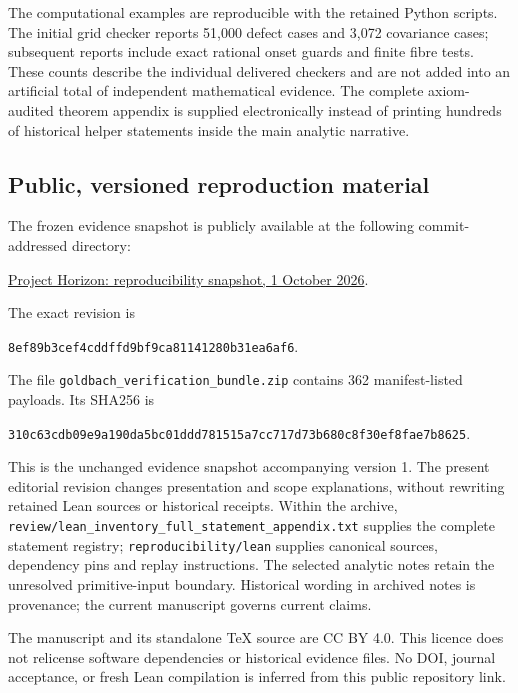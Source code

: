 \documentclass[11pt,a4paper]{article}
\theoremstyle{definition}
\theoremstyle{remark}
\begin{document}
The computational examples are reproducible with the retained Python scripts. The initial grid checker reports 51,000 defect cases and 3,072 covariance cases; subsequent reports include exact rational onset guards and finite fibre tests. These counts describe the individual delivered checkers and are not added into an artificial total of independent mathematical evidence. The complete axiom-audited theorem appendix is supplied electronically instead of printing hundreds of historical helper statements inside the main analytic narrative.

\subsection{Public, versioned reproduction material}
The frozen evidence snapshot is publicly available at the following commit-addressed directory:
\begin{center}\small
\href{https://github.com/seisner1967-hash/goldbach-horizon/tree/8ef89b3cef4cddffd9bf9ca81141280b31ea6af6/publications/2026-10-goldbach-framework}{Project Horizon: reproducibility snapshot, 1 October 2026}.
\end{center}
The exact revision is
\begin{center}\small\nolinkurl{8ef89b3cef4cddffd9bf9ca81141280b31ea6af6}.\end{center}
The file \texttt{goldbach\_verification\_bundle.zip} contains 362 manifest-listed payloads. Its SHA256 is
\begin{center}\scriptsize\nolinkurl{310c63cdb09e9a190da5bc01ddd781515a7cc717d73b680c8f30ef8fae7b8625}.\end{center}
This is the unchanged evidence snapshot accompanying version 1. The present editorial revision changes presentation and scope explanations, without rewriting retained Lean sources or historical receipts. Within the archive, \texttt{review/lean\_inventory\_full\_statement\_appendix.txt} supplies the complete statement registry; \texttt{reproducibility/lean} supplies canonical sources, dependency pins and replay instructions. The selected analytic notes retain the unresolved primitive-input boundary. Historical wording in archived notes is provenance; the current manuscript governs current claims.

The manuscript and its standalone TeX source are CC BY 4.0. This licence does not relicense software dependencies or historical evidence files. No DOI, journal acceptance, or fresh Lean compilation is inferred from this public repository link.
\end{document}
